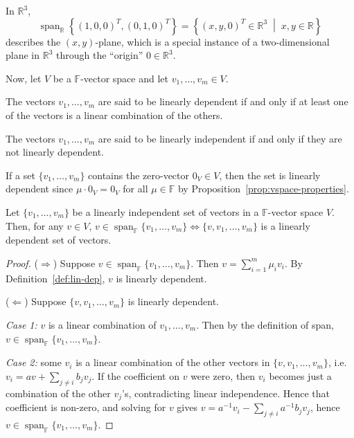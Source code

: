		\begin{example}
			In $\mathbb{R}^3$,
			\[
				\operatorname{span}_{\mathbb{R}}\left\{ (1,0,0)^T, (0,1,0)^T \right\} = \left\{ (x,y,0)^T \in \mathbb{R}^3 \;\middle|\; x, y \in \mathbb{R} \right\}
			\]
			describes the $(x,y)$-plane, which is a special instance of a two-dimensional plane in $\mathbb{R}^3$ through the ``origin'' $0 \in \mathbb{R}^3$.
		\end{example}
		
		\noindent Now, let $V$ be a $\mathbb{F}$-vector space and let $v_1, \dots, v_m \in V$.
		
		\begin{definition}
			\label{def:lin-dep}
			The vectors $v_1, \dots, v_m$ are said to be linearly dependent if and only if at least one of the vectors is a linear combination of the others.
		\end{definition} 
		
		\begin{definition}
			\label{def:lin-indep}
			The vectors $v_1, \dots, v_m$ are said to be linearly independent if and only if they are not linearly dependent.
		\end{definition}
		
		\begin{remark} 
			If a set $\{v_1, \dots, v_m\}$ contains the zero-vector $0_V \in V$, then the set is linearly dependent since $\mu \cdot 0_V = 0_V$ for all $\mu \in \mathbb{F}$ by Proposition~\ref{prop:vspace-properties}.
		\end{remark}
		
		\begin{proposition}
			\label{prop:extension-lemma}
			Let $\{v_1, \dots, v_m\}$ be a linearly independent set of vectors in a $\mathbb{F}$-vector space $V$. Then, for any $v \in V$,
			$v \in \operatorname{span}_{\mathbb{F}}\{v_1, \dots, v_m\} \iff \{v, v_1, \dots, v_m\}$ is a linearly dependent set of vectors.
		\end{proposition}
		
		\begin{proof}
			($\Rightarrow$) Suppose $v \in \operatorname{span}_{\mathbb{F}}\{v_1, \dots, v_m\}$. Then $v = \sum_{i=1}^{m} \mu_i v_i $. By Definition~\ref{def:lin-dep}, $v$ is linearly dependent.
			
			($\Leftarrow$) Suppose $\{v, v_1, \dots, v_m\}$ is linearly dependent.
			
			\textit{Case 1:} $v$ is a linear combination of $v_1, \dots, v_m$. Then by the definition of span, $v \in \operatorname{span}_{\mathbb{F}}\{v_1,\dots,v_m\}$.
			
			\textit{Case 2:} some $v_i$ is a linear combination of the other vectors in $\{v, v_1, \dots, v_m\}$, i.e. $v_i = av + \sum_{j \neq i} b_j v_j$. If the coefficient on $v$ were zero, then $v_i$ becomes just a combination of the other $v_j$'s, contradicting linear independence. Hence that coefficient is non-zero, and solving for $v$ gives $v = a^{-1}v_i - \sum_{j\neq i} a^{-1}b_j v_j$, hence $v \in \operatorname{span}_{\mathbb{F}}\{v_1,\dots,v_m\}$.
		\end{proof}
		
